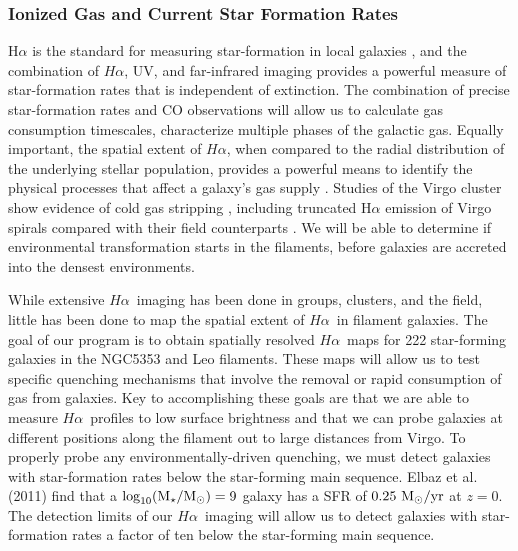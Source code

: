 \documentclass[11pt, preprint]{aastex}
\newcommand{\ha}{$H\alpha$}
\begin{document}
\vspace*{-1cm}
\subsubsection{Ionized Gas and Current Star Formation Rates}
\vspace*{-.3cm}

H$\alpha$ is the standard for measuring star-formation in local galaxies
\citep[e.g.][]{kennicutt98}, and the combination of \ha, UV, 
and far-infrared imaging provides a powerful measure of star-formation
rates that is independent of extinction.  The
combination of precise star-formation rates and CO observations will allow us to calculate
gas consumption timescales, characterize multiple phases of the
galactic gas. 
Equally important, the spatial extent of \ha, when compared to the
radial distribution of the underlying stellar population, provides a powerful
means to identify the physical processes that affect a galaxy's gas
supply \citep[e.g.][]{hodge83, dale01, gavazzi12,boselli15}.
Studies of the Virgo cluster show evidence of cold gas stripping
\citep[e.g.][]{koopmann98, koopmann04, dale01, crowl05, chung07,
  corbelli12, gavazzi12, boselli15}, including truncated H$\alpha$ emission of Virgo spirals
compared with their field counterparts \citep{koopmann04}.
We will be able to determine if environmental transformation starts in
the filaments, before galaxies are accreted into the densest environments.

While extensive \ha \ imaging has been done in groups, clusters, and the field,
little has been done to map the spatial extent of \ha \ in filament
galaxies.  
The goal of our program is to obtain spatially resolved \ha \ maps for 222 star-forming galaxies in
the NGC5353 and Leo filaments. These maps will allow us to test specific quenching
mechanisms that involve the removal or rapid consumption of gas from galaxies. Key to accomplishing
these goals are that we are able to measure \ha \ profiles to low surface brightness and that we can
probe galaxies at different positions along the filament out to large
distances from Virgo.
To properly probe any environmentally-driven quenching, we must detect galaxies
with star-formation rates below the star-forming main sequence. Elbaz et al. (2011) find that a
$\rm \log_{10}(M_\star/M_\odot) = 9$ galaxy has a SFR 
of $\rm 0.25~ M_\odot/yr$ at $z = 0$. 
The detection limits of our \ha \ imaging will allow us to detect galaxies with star-formation rates a
factor of ten below the star-forming main sequence.
\end{document}
